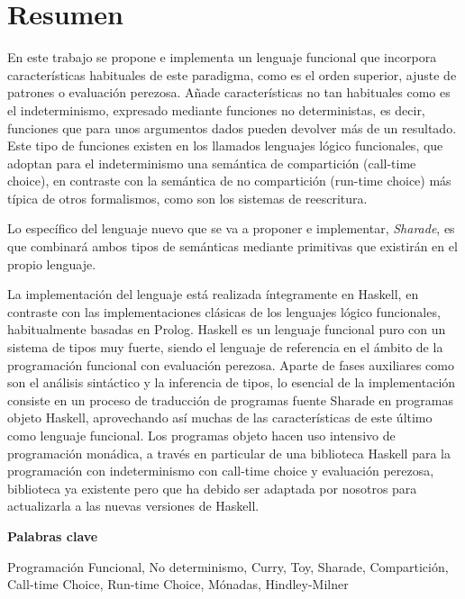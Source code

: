 \documentclass[class=article, crop=false]{standalone}
\begin{document}
\section{Resumen}

En este trabajo se propone e implementa un lenguaje funcional que incorpora características
habituales de este paradigma, como es el orden superior, ajuste de patrones o evaluación
perezosa. Añade características no tan habituales como es el indeterminismo, expresado
mediante funciones no deterministas, es decir, funciones que para unos argumentos dados
pueden devolver más de un resultado. Este tipo de funciones existen en los llamados lenguajes
lógico funcionales, que adoptan para el indeterminismo una semántica de compartición
(call-time choice), en contraste con la semántica de no compartición (run-time choice) más
típica de otros formalismos, como son los sistemas de reescritura.

Lo específico del lenguaje nuevo que se va a proponer e implementar, \textit{Sharade}, es que
combinará ambos tipos de semánticas mediante primitivas que existirán en el propio lenguaje.

La implementación del lenguaje está realizada íntegramente en Haskell, en contraste con las
implementaciones clásicas de los lenguajes lógico funcionales, habitualmente basadas en
Prolog. Haskell es un lenguaje funcional puro con un sistema de tipos muy fuerte, siendo el
lenguaje de referencia en el ámbito de la programación funcional con evaluación perezosa.
Aparte de fases auxiliares como son el análisis sintáctico y la inferencia de tipos, lo
esencial de la implementación consiste en un proceso de traducción de programas fuente
Sharade en programas objeto Haskell, aprovechando así muchas de las características de este
último como lenguaje funcional. Los programas objeto hacen uso intensivo de programación
monádica, a través en particular de una biblioteca Haskell para la programación con
indeterminismo con call-time choice y evaluación perezosa, biblioteca ya existente pero que
ha debido ser adaptada por nosotros para actualizarla a las nuevas versiones de Haskell.

\vspace{0.5cm}
\textbf{Palabras clave}

Programación Funcional, No determinismo, Curry, Toy, Sharade, Compartición, Call-time Choice,
Run-time Choice, Mónadas, Hindley-Milner
\end{document}

